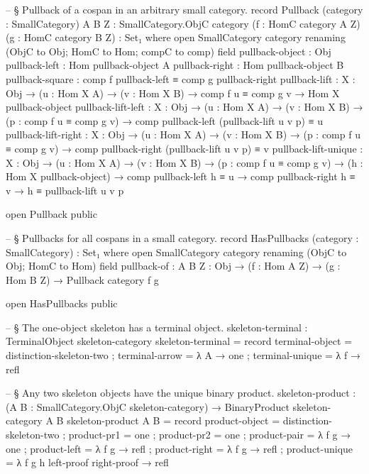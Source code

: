 \documentclass[11pt]{article}
\begin{document}
\begin{code}
-- § Pullback of a cospan in an arbitrary small category.
record Pullback
  (category : SmallCategory)
  {A B Z : SmallCategory.ObjC category}
  (f : HomC category A Z)
  (g : HomC category B Z) : Set₁ where
  open SmallCategory category renaming (ObjC to Obj; HomC to Hom; compC to comp)
  field
    pullback-object : Obj
    pullback-left   : Hom pullback-object A
    pullback-right  : Hom pullback-object B
    pullback-square : comp f pullback-left ≡ comp g pullback-right
    pullback-lift   : {X : Obj} →
                      (u : Hom X A) →
                      (v : Hom X B) →
                      comp f u ≡ comp g v →
                      Hom X pullback-object
    pullback-lift-left : {X : Obj} →
                         (u : Hom X A) →
                         (v : Hom X B) →
                         (p : comp f u ≡ comp g v) →
                         comp pullback-left (pullback-lift u v p) ≡ u
    pullback-lift-right : {X : Obj} →
                          (u : Hom X A) →
                          (v : Hom X B) →
                          (p : comp f u ≡ comp g v) →
                          comp pullback-right (pullback-lift u v p) ≡ v
    pullback-lift-unique : {X : Obj} →
                           (u : Hom X A) →
                           (v : Hom X B) →
                           (p : comp f u ≡ comp g v) →
                           (h : Hom X pullback-object) →
                           comp pullback-left h ≡ u →
                           comp pullback-right h ≡ v →
                           h ≡ pullback-lift u v p

open Pullback public

-- § Pullbacks for all cospans in a small category.
record HasPullbacks (category : SmallCategory) : Set₁ where
  open SmallCategory category renaming (ObjC to Obj; HomC to Hom)
  field
    pullback-of : {A B Z : Obj} →
                  (f : Hom A Z) →
                  (g : Hom B Z) →
                  Pullback category f g

open HasPullbacks public

-- § The one-object skeleton has a terminal object.
skeleton-terminal : TerminalObject skeleton-category
skeleton-terminal = record
  { terminal-object = distinction-skeleton-two
  ; terminal-arrow  = λ A → one
  ; terminal-unique = λ f → refl
  }

-- § Any two skeleton objects have the unique binary product.
skeleton-product :
  (A B : SmallCategory.ObjC skeleton-category) → BinaryProduct skeleton-category A B
skeleton-product A B = record
  { product-object = distinction-skeleton-two
  ; product-pr1    = one
  ; product-pr2    = one
  ; product-pair   = λ f g → one
  ; product-left   = λ f g → refl
  ; product-right  = λ f g → refl
  ; product-unique = λ f g h left-proof right-proof → refl
  }


\end{code}
\end{document}
